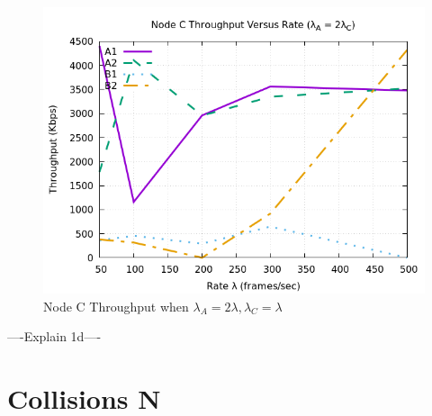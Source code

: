 \documentclass[12pt]{article}
\begin{document}
\begin{enumerate}
{            \begin{figure}[!htb]
                \centering
                \includegraphics[width=5in]{1D.png}
                \caption{Node C Throughput when \(\lambda{}_A = 2\lambda{}, \lambda{}_C = \lambda{}\) }
                \label{fig:1D}
            \end{figure}

            ----Explain 1d----
        }
        
    \end{enumerate}
        
\clearpage        
\section{Collisions N}
\end{document}

